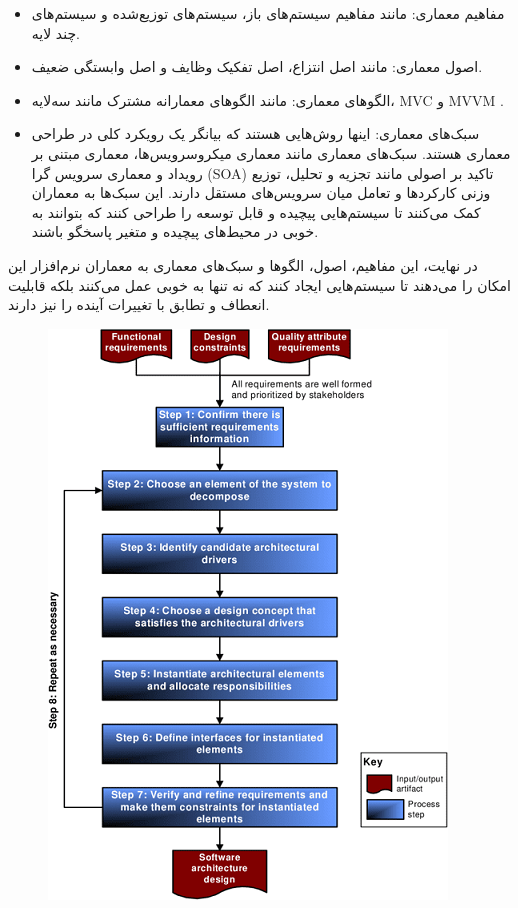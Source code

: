 \begin{itemize}
	\item مفاهیم معماری: مانند مفاهیم سیستم‌های باز، سیستم‌های توزیع‌شده و سیستم‌های چند لایه.
	
	\item اصول معماری:
	 مانند اصل انتزاع، اصل تفکیک وظایف و اصل وابستگی ضعیف.
	
	\item الگوهای معماری:
	 مانند الگوهای معمارانه مشترک مانند سه‌لایه، MVC و MVVM .
	 
	 \item سبک‌های معماری: اینها روش‌هایی هستند که بیانگر یک رویکرد کلی در طراحی معماری هستند. سبک‌های معماری مانند معماری میکروسرویس‌ها، معماری مبتنی بر رویداد و معماری سرویس گرا (SOA) تاکید بر اصولی مانند تجزیه و تحلیل، توزیع وزنی کارکردها و تعامل میان سرویس‌های مستقل دارند. این سبک‌ها به معماران کمک می‌کنند تا سیستم‌هایی پیچیده و قابل توسعه را طراحی کنند که بتوانند به خوبی در محیط‌های پیچیده و متغیر پاسخگو باشند.
	 
\end{itemize}
	 
در نهایت، این مفاهیم، اصول، الگوها و سبک‌های معماری به معماران نرم‌افزار این امکان را می‌دهند تا سیستم‌هایی ایجاد کنند که نه تنها به خوبی عمل می‌کنند بلکه قابلیت انعطاف و تطابق با تغییرات آینده را نیز دارند.

\begin{figure}[H]
	\centering
	\includegraphics{pic11.png}
	\label{fig:label4}
\end{figure}

